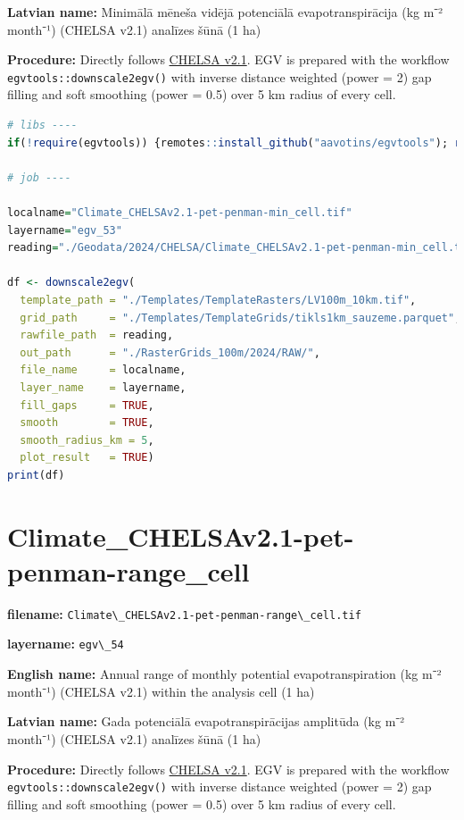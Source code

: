 \documentclass[
]{book}
\newcommand{\passthrough}[1]{#1}
\begin{document}
\textbf{Latvian name:} Minimālā mēneša vidējā potenciālā evapotranspirācija (kg m⁻² month⁻¹) (CHELSA v2.1) analīzes šūnā (1 ha)

\textbf{Procedure:} Directly follows \hyperref[Ch04.11]{CHELSA v2.1}. EGV is prepared with the
workflow \passthrough{\lstinline!egvtools::downscale2egv()!} with inverse distance weighted (power = 2)
gap filling and soft smoothing (power = 0.5) over 5 km radius of every cell.

\begin{lstlisting}[language=R]
# libs ----
if(!require(egvtools)) {remotes::install_github("aavotins/egvtools"); require(egvtools)}

# job ----

localname="Climate_CHELSAv2.1-pet-penman-min_cell.tif"
layername="egv_53"
reading="./Geodata/2024/CHELSA/Climate_CHELSAv2.1-pet-penman-min_cell.tif"

df <- downscale2egv(
  template_path = "./Templates/TemplateRasters/LV100m_10km.tif",
  grid_path     = "./Templates/TemplateGrids/tikls1km_sauzeme.parquet",
  rawfile_path  = reading,
  out_path      = "./RasterGrids_100m/2024/RAW/",
  file_name     = localname,
  layer_name    = layername,
  fill_gaps     = TRUE,
  smooth        = TRUE,
  smooth_radius_km = 5,
  plot_result   = TRUE)
print(df)
\end{lstlisting}

\section{Climate\_CHELSAv2.1-pet-penman-range\_cell}\label{ch06.054}

\textbf{filename:} \passthrough{\lstinline!Climate\_CHELSAv2.1-pet-penman-range\_cell.tif!}

\textbf{layername:} \passthrough{\lstinline!egv\_54!}

\textbf{English name:} Annual range of monthly potential evapotranspiration (kg m⁻² month⁻¹) (CHELSA v2.1) within the analysis cell (1 ha)

\textbf{Latvian name:} Gada potenciālā evapotranspirācijas amplitūda (kg m⁻² month⁻¹) (CHELSA v2.1) analīzes šūnā (1 ha)

\textbf{Procedure:} Directly follows \hyperref[Ch04.11]{CHELSA v2.1}. EGV is prepared with the
workflow \passthrough{\lstinline!egvtools::downscale2egv()!} with inverse distance weighted (power = 2)
gap filling and soft smoothing (power = 0.5) over 5 km radius of every cell.
\end{document}
